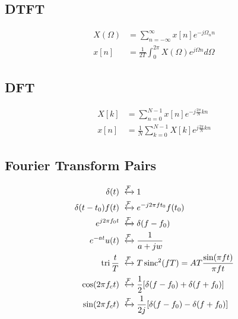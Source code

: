 \subsection{DTFT}
\begin{align*}
    X(\Omega) &= \sum_{n=-\infty}^\infty x[n] e^{-j\Omega_n n}\\
    x[n] &= \frac{1}{2T}\int_0^{2\pi}X(\Omega)e^{j\Omega n}d\Omega
\end{align*}
\subsection{DFT}
\begin{align*}
    X[k] &= \sum_{n=0}^{N-1}x[n]e^{-j\frac{2\pi}{N}kn}\\
    x[n] &= \frac{1}{N}\sum_{k=0}^{N-1}X[k]e^{j\frac{2\pi}{N}kn}
\end{align*}
\subsection{Fourier Transform Pairs}
\begin{align*}
    \delta(t) &\xleftrightarrow{\mathcal{F}} 1\\
    \delta(t-t_0)f(t) &\xleftrightarrow{\mathcal{F}} e^{-j2\pi ft_0}f(t_0)\\
    e^{j2\pi f_0t} &\xleftrightarrow{\mathcal{F}} \delta(f-f_0)\\
    e^{-at}u(t) &\xleftrightarrow{\mathcal{F}} \frac{1}{a + jw}\\
    \tri \frac{t}{T} &\xleftrightarrow{\mathcal{F}} T\sinc^2 (fT) = AT\frac{\sin (\pi ft)}{\pi ft}\\
    \cos (2\pi f_c t) &\xleftrightarrow{\mathcal{F}} \frac{1}{2}[\delta(f-f_0) + \delta(f + f_0)]\\
    \sin (2\pi f_c t) &\xleftrightarrow{\mathcal{F}} \frac{1}{2j}[\delta(f-f_0) - \delta(f + f_0)]
\end{align*}